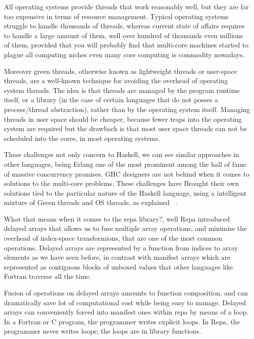 \documentclass{tmr}
\begin{document}
All operating systems provide threads that work reasonably well, but they are far too expensive in terms 
of resource management. Typical operating systems struggle to handle thousands of threads, whereas current state of 
affairs requires to handle a large amount of them, well over hundred of thousands even millions of them, 
provided that you will probably find that multi-core machines started to plague all computing
niches even many core computing is commodity nowadays.

Moreover green threads, otherwise known as lightweight threads
or user-space threads, are a well-known technique for avoiding the overhead 
of operating system threads. The idea is that threads are managed by the 
program runtime itself, or a library (in the case of certain languages 
that do not posses a process/thread abstraction), rather than by the operating system itself. 
Managing threads in user space should be cheaper, because fewer traps into 
the operating system are required but the drawback is that most user space threads 
can not be scheduled into the cores, in most operating systems.

These challenges not only concern to Haskell, we can see similar approaches
in other languages, being Erlang one of the most prominent among the hall of 
fame of massive concurrency promises. GHC designers are not behind when it 
comes to solutions to the multi-core problems. These challenges have Brought their
own solutions tied to the particular nature of the Haskell language,
 using a intelligent mixture of Green threads and OS threads,
as explained ~\cite{Peyton}.

What that means when it comes to the repa library?, well Repa introduced
delayed arrays that allows us to fuse multiple array operations, and 
minimise the overhead of index-space transformions, that are one of the most
common operations. Delayed arrays are represented by a function from indices 
to array elements as we have seen before, in contrast with manifest arrays
which are represented as contiguous blocks of unboxed values that other 
languages like Fortran traverse all the time. 

Fusion of operations on delayed arrays amounts to function composition, and 
can dramatically save lot of computational cost while being easy to manage. 
Delayed arrays can conveniently forced into manifest ones within repa by means 
of a loop. In a Fortran or C program, the programmer writes explicit loops. 
In Repa, the programmer never writes loops; the loops are in library functions.
\end{document}
